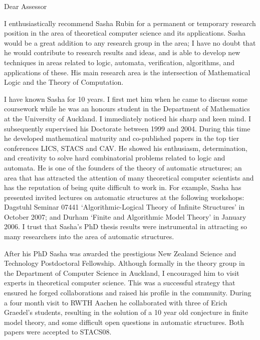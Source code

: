 \documentclass{letter}
\date{January, $2008$}
\begin{document}
\begin{letter}{}
\opening{Dear Assessor}

I enthusiastically recommend Sasha Rubin for a permanent or temporary research position in the area of theoretical computer science and its applications. Sasha would be a great addition to any research group in the area; I have no doubt that he would contribute to research results and ideas, and is able to develop new techniques in areas related to logic, automata, verification, algorithms, and applications of these. His main research area is the intersection of Mathematical Logic and the Theory of Computation.

\smallskip


I have known Sasha for 10 years. I first met him when he came to discuss some coursework while he was an honours student in the Department of Mathematics at the University of Auckland.
I immediately noticed his sharp and keen mind. I subsequently supervised his Doctorate between 1999 and 2004. During this time he developed mathematical maturity and co-published papers in the top tier conferences LICS, STACS and CAV. He showed his enthusiasm, determination, and creativity to solve hard
combinatorial problems related to logic and automata. He is one of the founders of the theory of automatic structures; an area that has attracted the attention of many theoretical computer scientists and has the reputation of being quite difficult to work in. For example, Sasha has presented invited lectures on automatic structures at the following workshops: Dagstuhl Seminar 07441 `Algorithmic-Logical Theory of Infinite Structures' in October 2007; and Durham `Finite and Algorithmic Model Theory' in January 2006. I trust that Sasha's PhD thesis results were instrumental in attracting so many researchers into the area of automatic structures.

\smallskip

After his PhD Sasha was awarded the prestigious New Zealand Science and Technology Postdoctoral Fellowship. Although formally in the theory group in the Department of Computer Science in Auckland, I encouraged him to visit experts in theoretical computer science. This was a successful strategy that ensured he forged collaborations and raised his profile
in the community. During a four month visit to RWTH Aachen he collaborated with three of Erich Graedel's students, resulting in the solution of a 10 year old conjecture in finite model theory, and some difficult open questions in automatic structures. Both papers were accepted to STACS08.


\end{letter}
\end{document}
